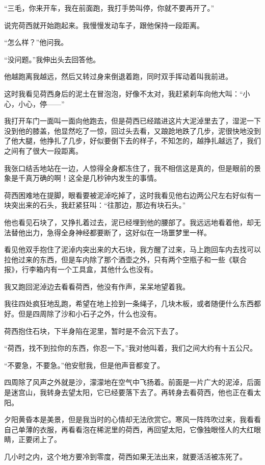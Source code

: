 \par “三毛，你来开车，我在前面跑，我打手势叫停，你就不要再开了。”
\par 说完荷西就开始跑起来。我慢慢发动车子，跟他保持一段距离。
\par “怎么样？”他问我。
\par “没问题。”我伸出头去回答他。
\par 他越跑离我越远，然后又转过身来倒退着跑，同时双手挥动着叫我前进。
\par 这时我看见荷西身后的泥土在冒泡泡，好像不太对，我赶紧刹车向他大叫：“小心，小心，停——”
\par 我打开车门一面叫一面向他跑去，但是荷西已经踏进这片大泥淖里去了，湿泥一下没到他的膝盖，他显然吃了一惊，回过头去看，又踉跄地跌了几步，泥很快地没到了他大腿，他挣扎了几步，好似要倒下去的样子，不知怎的，越挣扎越远了，我们之间有了很大一段距离。
\par 我张口结舌地站在一边，人惊得全身都冻住了，我不相信这是真的，但是眼前的景象是千真万确的啊！这全是几秒钟内发生的事情。
\par 荷西困难地在提脚，眼看要被泥淖吃掉了，这时我看见他右边两公尺左右好似有一块突出来的石头，我赶紧狂叫：“往那边，那边有块石头。”
\par 他也看见石块了，又挣扎着过去，泥已经埋到他的腰部了。我远远地看着他，却无法替他出力，急得全身神经都要断了，这好似在一场噩梦里一样。
\par 看见他双手抱住了泥淖内突出来的大石块，我方醒了过来，马上跑回车内去找可以拉他过来的东西，但是车内除了那个酒壶之外，只有两个空瓶子和一些《联合报》，行李箱内有一个工具盒，其他什么也没有。
\par 我又跑回泥淖边去看看荷西，他没有作声，呆呆地望着我。
\par 我往四处疯狂地乱跑，希望在地上捡到一条绳子，几块木板，或者随便什么东西都好。但是四周除了沙和小石子之外，什么也没有。
\par 荷西抱住石块，下半身陷在泥里，暂时是不会沉下去了。
\par “荷西，找不到拉你的东西，你忍一下。”我对他叫着，我们之间大约有十五公尺。
\par “不要急，不要急。”他安慰我，但是他声音都变了。
\par 四周除了风声之外就是沙，濛濛地在空气中飞扬着。前面是一片广大的泥淖，后面是迷宫山，我转身去望太阳，它已经要落下去了。再转身去看荷西，他也正在看太阳。
\par 夕阳黄昏本是美景，但是我当时的心情却无法欣赏它。寒风一阵阵吹过来，我看看自己单薄的衣服，再看看泡在稀泥里的荷西，再回望太阳，它像独眼怪人的大红眼睛，正要闭上了。
\par 几小时之内，这个地方要冷到零度，荷西如果无法出来，就要活活被冻死了。
